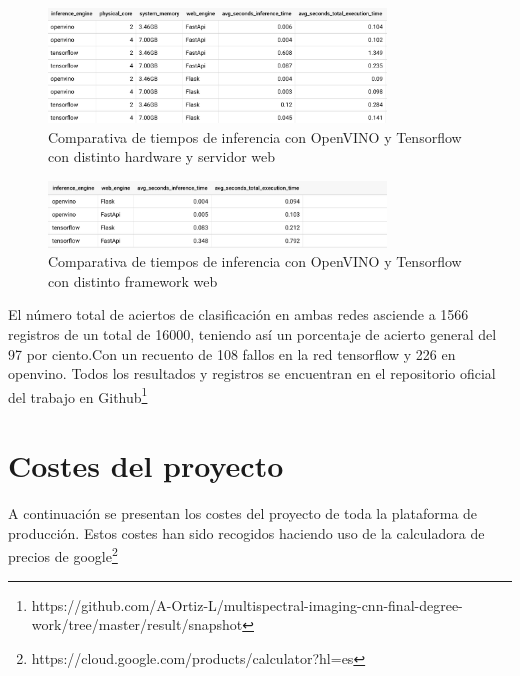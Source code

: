 \begin{figure}
    \centering
    \includegraphics[width=0.8\textwidth]{images/chapter5/time_general.png}
    \caption{Comparativa de tiempos de inferencia con OpenVINO y Tensorflow con distinto hardware y servidor web}
    \label{fig:Comparativa de tiempo de inferencia con OpenVINO y Tensorflow con distinto hardware y servidor web}
\end{figure}



\begin{figure}
    \centering
    \includegraphics[width=0.8\textwidth]{images/chapter5/time_inference_web.png}
    \caption{Comparativa de tiempos de inferencia con OpenVINO y Tensorflow con distinto framework web}
    \label{fig:Comparativa de tiempo de inferencia con OpenVINO y Tensorflow con distinto framework web}
\end{figure}

El número total de aciertos de clasificación en ambas redes asciende a 1566 registros de un total de 16000, teniendo así un porcentaje de acierto general
del 97 por ciento.Con un recuento de 108 fallos en la red tensorflow y 226 en openvino.
Todos los resultados y registros se encuentran en el repositorio oficial del trabajo en Github\footnote{https://github.com/A-Ortiz-L/multispectral-imaging-cnn-final-degree-work/tree/master/result/snapshot}


\section{Costes del proyecto}\label{sec:costes-del-proyecto}
A continuación se presentan los costes del proyecto de toda la plataforma de producción.
Estos costes han sido recogidos haciendo uso de la calculadora de precios de google\footnote{https://cloud.google.com/products/calculator?hl=es}

